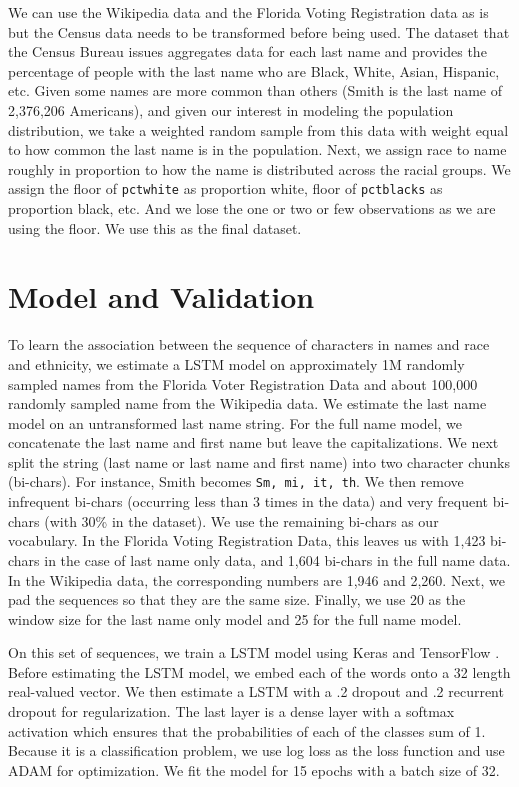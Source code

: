 \documentclass[12pt, letterpaper]{article}
\begin{document}
We can use the Wikipedia data and the Florida Voting Registration data as is but the Census data needs to be transformed before being used. The dataset that the Census Bureau issues aggregates data for each last name and provides the percentage of people with the last name who are Black, White, Asian, Hispanic, etc. Given some names are more common than others (Smith is the last name of 2,376,206 Americans), and given our interest in modeling the population distribution, we take a weighted random sample from this data with weight equal to how common the last name is in the population. Next, we assign race to name roughly in proportion to how the name is distributed across the racial groups. We assign the floor of \texttt{pctwhite} as proportion white, floor of \texttt{pctblacks} as proportion black, etc. And we lose the one or two or few observations as we are using the floor. We use this as the final dataset.

\section*{Model and Validation}
To learn the association between the sequence of characters in names and race and ethnicity, we estimate a LSTM model \citep{graves2005framewise, gers1999learning} on approximately 1M randomly sampled names from the Florida Voter Registration Data and about 100,000 randomly sampled name from the Wikipedia data. We estimate the last name model on an untransformed last name string. For the full name model, we concatenate the last name and first name but leave the capitalizations. We next split the string (last name or last name and first name) into two character chunks (bi-chars). For instance, Smith becomes {\tt Sm, mi, it, th}. We then remove infrequent bi-chars (occurring less than 3 times in the data) and very frequent bi-chars (with 30\% in the dataset). We use the remaining bi-chars as our vocabulary. In the Florida Voting Registration Data, this leaves us with 1,423 bi-chars in the case of last name only data, and 1,604 bi-chars in the full name data. In the Wikipedia data, the corresponding numbers are 1,946 and 2,260. Next, we pad the sequences so that they are the same size. Finally, we use 20 as the window size for the last name only model and 25 for the full name model. 

On this set of sequences, we train a LSTM model using Keras \citep{chollet2015keras} and TensorFlow \citep{abadi2016tensorflow}. Before estimating the LSTM model, we embed each of the words onto a 32 length real-valued vector. We then estimate a LSTM with a .2 dropout \citep{srivastava2014dropout} and .2 recurrent dropout for regularization. The last layer is a dense layer with a softmax activation which ensures that the probabilities of each of the classes sum of 1. Because it is a classification problem, we use log loss as the loss function and use ADAM for optimization. We fit the model for 15 epochs with a batch size of 32.
\end{document}
